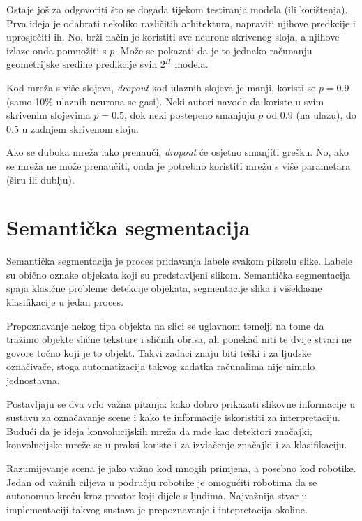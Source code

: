 \documentclass[times, utf8, diplomski, numeric]{fer}
\begin{document}
Ostaje još za odgovoriti što se događa tijekom testiranja modela (ili korištenja). Prva ideja je odabrati nekoliko različitih arhitektura, napraviti njihove predkcije i uprosječiti ih. No, brži način je koristiti sve neurone skrivenog sloja, a njihove izlaze onda pomnožiti s $p$. Može se pokazati da je to jednako računanju geometrijske sredine predikcije svih $2^H$ modela.

Kod mreža s više slojeva, \emph{dropout} kod ulaznih slojeva je manji, koristi se $p = 0.9$ (samo 10\% ulaznih neurona se gasi). Neki autori navode da koriste u svim skrivenim slojevima $p = 0.5$, dok neki postepeno smanjuju $p$ od 0.9 (na ulazu), do 0.5 u zadnjem skrivenom sloju.

Ako se duboka mreža lako prenauči, \emph{dropout} će osjetno smanjiti grešku. No, ako se mreža ne može prenaučiti, onda je potrebno koristiti mrežu s više parametara (širu ili dublju).


\chapter{Semantička segmentacija}

Semantička segmentacija je proces pridavanja labele svakom pikselu slike. Labele su obično oznake objekata koji su predstavljeni slikom.
Semantička segmentacija spaja klasične probleme detekcije objekata, segmentacije slika i višeklasne klasifikacije u jedan proces.

Prepoznavanje nekog tipa objekta na slici se uglavnom temelji na tome da tražimo objekte slične teksture i sličnih obrisa, ali ponekad niti te dvije stvari ne govore točno koji je to objekt. Takvi zadaci znaju biti teški i za ljudske označivače, stoga automatizacija takvog zadatka računalima nije nimalo jednostavna.

Postavljaju se dva vrlo važna pitanja: kako dobro prikazati slikovne informacije u sustavu za označavanje scene i kako te informacije iskoristiti za interpretaciju. Budući da je ideja konvolucijskih mreža da rade kao detektori značajki, konvolucijske mreže se u praksi koriste i za izvlačenje značajki i za klasifikaciju.

Razumijevanje scena je jako važno kod mnogih primjena, a posebno kod robotike. Jedan od važnih ciljeva u području robotike je omogućiti robotima da se autonomno kreću kroz prostor koji dijele s ljudima. Najvažnija stvar u implementaciji takvog sustava je prepoznavanje i intepretacija okoline.
\end{document}
